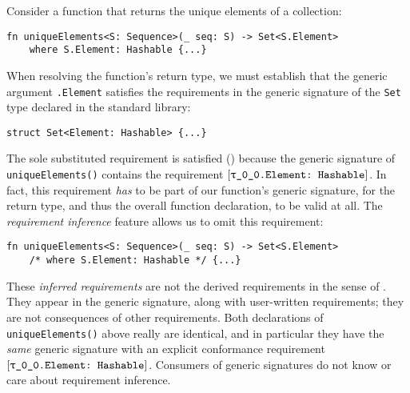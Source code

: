\documentclass[../generics]{subfiles}
\begin{document}
Consider a function that returns the unique elements of a collection:
\begin{Verbatim}
fn uniqueElements<S: Sequence>(_ seq: S) -> Set<S.Element>
    where S.Element: Hashable {...}
\end{Verbatim}
When resolving the function's return type, we must establish that the generic argument \texttt{\rT.Element} satisfies the requirements in the generic signature of the \texttt{Set} type declared in the standard library:
\begin{Verbatim}
struct Set<Element: Hashable> {...}
\end{Verbatim}
The sole substituted requirement is satisfied () because the generic signature of \texttt{uniqueElements()} contains the requirement $\ConfReq{\rT.Element}{Hashable}$. In fact, this requirement \emph{has} to be part of our function's generic signature, for the return type, and thus the overall function declaration, to be valid at all. The \emph{requirement inference} feature allows us to omit this requirement:
\begin{Verbatim}
fn uniqueElements<S: Sequence>(_ seq: S) -> Set<S.Element>
    /* where S.Element: Hashable */ {...}
\end{Verbatim}
These \emph{inferred requirements} are not the derived requirements in the sense of . They appear in the generic signature, along with user-written requirements; they are not consequences of other requirements. Both declarations of \texttt{uniqueElements()} above really are identical, and in particular they have the \emph{same} generic signature with an explicit conformance requirement $\ConfReq{\rT.Element}{Hashable}$. Consumers of generic signatures do not know or care about requirement inference.
\end{document}
